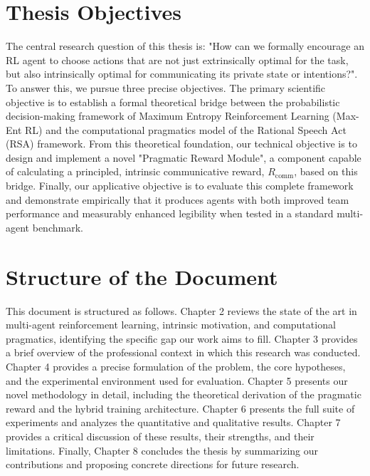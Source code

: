 \documentclass[12pt, a4paper]{report}
\newcommand{\Rcomm}{R_{\text{comm}}}
\begin{document}
\section{Thesis Objectives}
The central research question of this thesis is: "How can we formally encourage an RL agent to choose actions that are not just extrinsically optimal for the task, but also intrinsically optimal for communicating its private state or intentions?". To answer this, we pursue three precise objectives. The primary scientific objective is to establish a formal theoretical bridge between the probabilistic decision-making framework of Maximum Entropy Reinforcement Learning (Max-Ent RL) and the computational pragmatics model of the Rational Speech Act (RSA) framework. From this theoretical foundation, our technical objective is to design and implement a novel "Pragmatic Reward Module", a component capable of calculating a principled, intrinsic communicative reward, $\Rcomm$, based on this bridge. Finally, our applicative objective is to evaluate this complete framework and demonstrate empirically that it produces agents with both improved team performance and measurably enhanced legibility when tested in a standard multi-agent benchmark.

\section{Structure of the Document}
This document is structured as follows. Chapter 2 reviews the state of the art in multi-agent reinforcement learning, intrinsic motivation, and computational pragmatics, identifying the specific gap our work aims to fill. Chapter 3 provides a brief overview of the professional context in which this research was conducted. Chapter 4 provides a precise formulation of the problem, the core hypotheses, and the experimental environment used for evaluation. Chapter 5 presents our novel methodology in detail, including the theoretical derivation of the pragmatic reward and the hybrid training architecture. Chapter 6 presents the full suite of experiments and analyzes the quantitative and qualitative results. Chapter 7 provides a critical discussion of these results, their strengths, and their limitations. Finally, Chapter 8 concludes the thesis by summarizing our contributions and proposing concrete directions for future research.


\end{document}
